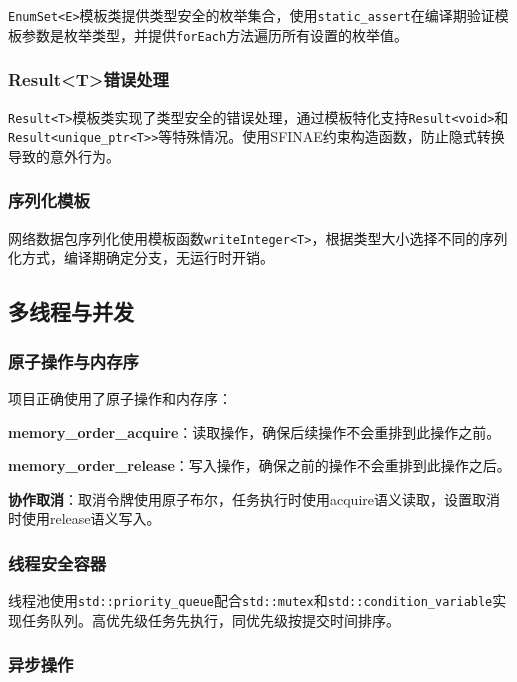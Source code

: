 \texttt{EnumSet<E>}模板类提供类型安全的枚举集合，使用\texttt{static\_assert}在编译期验证模板参数是枚举类型，并提供\texttt{forEach}方法遍历所有设置的枚举值。

\subsubsection{Result<T>错误处理}

\texttt{Result<T>}模板类实现了类型安全的错误处理，通过模板特化支持\texttt{Result<void>}和\texttt{Result<unique\_ptr<T>>}等特殊情况。使用SFINAE约束构造函数，防止隐式转换导致的意外行为。

\subsubsection{序列化模板}

网络数据包序列化使用模板函数\texttt{writeInteger<T>}，根据类型大小选择不同的序列化方式，编译期确定分支，无运行时开销。

\subsection{多线程与并发}

\subsubsection{原子操作与内存序}

项目正确使用了原子操作和内存序：

\textbf{memory\_order\_acquire}：读取操作，确保后续操作不会重排到此操作之前。

\textbf{memory\_order\_release}：写入操作，确保之前的操作不会重排到此操作之后。

\textbf{协作取消}：取消令牌使用原子布尔，任务执行时使用acquire语义读取，设置取消时使用release语义写入。

\subsubsection{线程安全容器}

线程池使用\texttt{std::priority\_queue}配合\texttt{std::mutex}和\texttt{std::condition\_variable}实现任务队列。高优先级任务先执行，同优先级按提交时间排序。

\subsubsection{异步操作}

